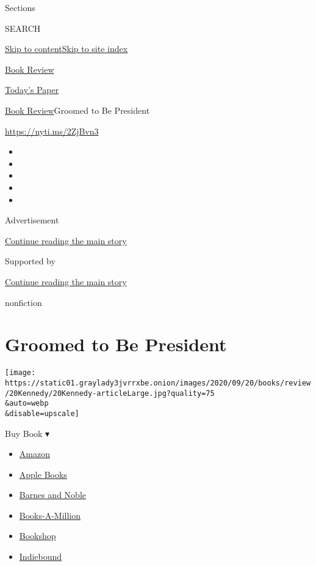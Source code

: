 Sections

SEARCH

\protect\hyperlink{site-content}{Skip to
content}\protect\hyperlink{site-index}{Skip to site index}

\href{https://www.nytimes3xbfgragh.onion/section/books/review}{Book
Review}

\href{https://myaccount.nytimes3xbfgragh.onion/auth/login?response_type=cookie\&client_id=vi}{}

\href{https://www.nytimes3xbfgragh.onion/section/todayspaper}{Today's
Paper}

\href{/section/books/review}{Book Review}\textbar{}Groomed to Be
President

\url{https://nyti.ms/2ZjBvn3}

\begin{itemize}
\item
\item
\item
\item
\item
\end{itemize}

Advertisement

\protect\hyperlink{after-top}{Continue reading the main story}

Supported by

\protect\hyperlink{after-sponsor}{Continue reading the main story}

nonfiction

\hypertarget{groomed-to-be-president}{%
\section{Groomed to Be President}\label{groomed-to-be-president}}

\texttt{[image: https://static01.graylady3jvrrxbe.onion/images/2020/09/20/books/review/20Kennedy/20Kennedy-articleLarge.jpg?quality=75\\\&auto=webp\\\&disable=upscale]}

Buy Book ▾

\begin{itemize}
\tightlist
\item
  \href{https://www.amazon.com/gp/search?index=books\&tag=NYTBSREV-20\&field-keywords=JFK+Logevall\%2C+Fredrik}{Amazon}
\item
  \href{https://du-gae-books-dot-nyt-du-prd.appspot.com/buy?title=JFK\&author=Logevall\%2C+Fredrik}{Apple
  Books}
\item
  \href{https://www.anrdoezrs.net/click-7990613-11819508?url=https\%3A\%2F\%2Fwww.barnesandnoble.com\%2Fw\%2F\%3Fean\%3D9780812997132}{Barnes
  and Noble}
\item
  \href{https://www.anrdoezrs.net/click-7990613-35140?url=https\%3A\%2F\%2Fwww.booksamillion.com\%2Fp\%2FJFK\%2FLogevall\%252C\%2BFredrik\%2F9780812997132}{Books-A-Million}
\item
  \href{https://bookshop.org/a/3546/9780812997132}{Bookshop}
\item
  \href{https://www.indiebound.org/book/9780812997132?aff=NYT}{Indiebound}
\end{itemize}

